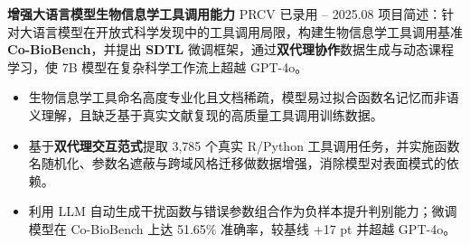 \textbf{增强大语言模型生物信息学工具调用能力} \hfill PRCV 已录用  -- 2025.08 \titlebreak
项目简述：针对大语言模型在开放式科学发现中的工具调用局限，构建生物信息学工具调用基准 \textbf{Co-BioBench}，并提出 \textbf{SDTL} 微调框架，通过\textbf{双代理协作}数据生成与动态课程学习，使 7B 模型在复杂科学工作流上超越 GPT-4o。
\begin{itemize}[nosep]
    \item 生物信息学工具命名高度专业化且文档稀疏，模型易过拟合函数名记忆而非语义理解，且缺乏基于真实文献复现的高质量工具调用训练数据。
    \item 基于\textbf{双代理交互范式}提取 3,785 个真实 R/Python 工具调用任务，并实施函数名随机化、参数名遮蔽与跨域风格迁移做数据增强，消除模型对表面模式的依赖。
    \item 利用 LLM 自动生成干扰函数与错误参数组合作为负样本提升判别能力；微调模型在 Co-BioBench 上达 51.65\% 准确率，较基线 +17 pt 并超越 GPT-4o。
\end{itemize}
